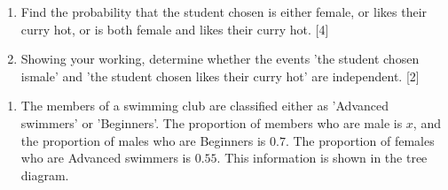 \begin{enumerate}
\begin{enumerate}
	\item Find the probability that the student chosen is either female, or likes their curry hot, or is both female and likes their curry hot. \hfill[4]
	\item Showing your working, determine whether the events 'the student chosen ismale' and 'the student	chosen likes their curry hot' are independent. \hfill [2]
\end{enumerate}


		
	\end{enumerate}


\newpage
	
\exam   %


\begin{enumerate}
	
	
	\item  The members of a swimming club are classified either as 'Advanced swimmers' or 'Beginners'. The
	proportion of members who are male is $x$, and the proportion of males who are Beginners is $0.7$. The
	proportion of females who are Advanced swimmers is $0.55$. This information is shown in the tree
	diagram.
	
	\begin{figure*}[!htpb]
		\centering
	\end{figure*}
	

\end{enumerate}
